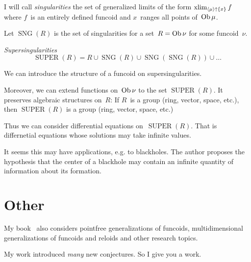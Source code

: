 \documentclass{amsart}
\begin{document}
I will call \emph{singularities} the set of generalized limits of the form $\operatorname{xlim}_{\left\langle \mu\right\rangle\uparrow\{x\}}f$ where $f$~is an entirely defined funcoid and $x$~ranges all points of~$\operatorname{Ob}\mu$.

Let $\operatorname{SNG}(R)$ is the set of singularities for
a set~$R=\operatorname{Ob}\nu$ for some funcoid~$\nu$.

\begin{defn}
\emph{Supersingularities}
\[
\operatorname{SUPER}(R) =
R\cup\operatorname{SNG}(R)\cup
\operatorname{SNG}(\operatorname{SNG}(R))\cup\dots
\]
\end{defn}

We can introduce the structure of a funcoid on supersingularities.

Moreover, we can extend functions on~$\operatorname{Ob}\nu$ to the set
$\operatorname{SUPER}(R)$. It preserves algebraic structures
on~$R$: If $R$~is a group (ring, vector, space, etc.), then $\operatorname{SUPER}(R)$ is a group (ring, vector, space, etc.)

Thus we can consider differential equations
on~$\operatorname{SUPER}(R)$. That is differnetial equations
whose solutions may take infinite values.

It seems this may have applications, e.g. to blackholes.
The author proposes the hypothesis that the center of a blackhole
may contain an infinite quantity of information about its
formation.

\section{Other}

My book~\cite{volume-1-edition1} also considers pointfree generalizations of funcoids,
multidimensional generalizations of funcoids and reloids and other research topics.

My work introduced \emph{many} new conjectures. So I give you a work.



\end{document}
